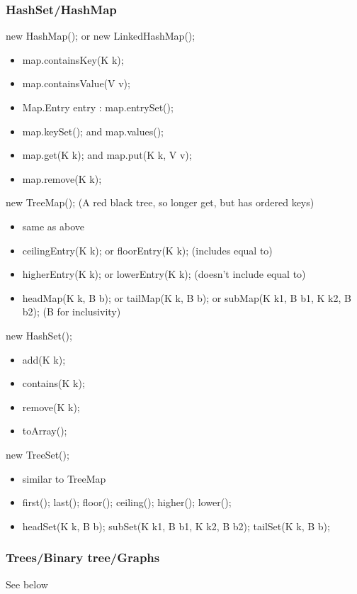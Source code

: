 \documentclass{article}
\begin{document}
\subsubsection{HashSet/HashMap}
new HashMap(); or new LinkedHashMap();
\begin{itemize}
    \item map.containsKey(K k);
    \item map.containsValue(V v);
    \item Map.Entry entry : map.entrySet();
    \item map.keySet(); and map.values();
    \item map.get(K k); and map.put(K k, V v);
    \item map.remove(K k);
\end{itemize}
new TreeMap(); (A red black tree, so longer get, but has ordered keys)
\begin{itemize}
    \item same as above
    \item ceilingEntry(K k); or floorEntry(K k); (includes equal to)
    \item higherEntry(K k); or lowerEntry(K k); (doesn't include equal to)
    \item headMap(K k, B b); or tailMap(K k, B b); or subMap(K k1, B b1, K k2, B b2); (B for inclusivity)
\end{itemize}
new HashSet();
\begin{itemize}
    \item add(K k);
    \item contains(K k);
    \item remove(K k);
    \item toArray();
\end{itemize}
new TreeSet();
\begin{itemize}
    \item similar to TreeMap
    \item first(); last(); floor(); ceiling(); higher(); lower();
    \item headSet(K k, B b); subSet(K k1, B b1, K k2, B b2); tailSet(K k, B b);
\end{itemize}
\subsubsection{Trees/Binary tree/Graphs}
See below
\end{document}
